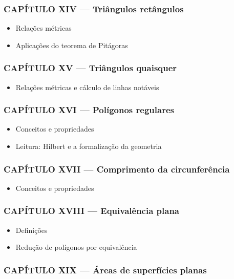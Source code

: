 \documentclass[a4paper,12pt]{article}[abntex2]
\begin{document}
\subsubsection*{CAPÍTULO XIV — Triângulos retângulos}

\begin{itemize}
\item Relações métricas
\item Aplicações do teorema de Pitágoras
\end{itemize}
\subsubsection*{CAPÍTULO XV — Triângulos quaisquer}

\begin{itemize}
\item Relações métricas e cálculo de linhas notáveis
\end{itemize}
\subsubsection*{CAPÍTULO XVI — Polígonos regulares}

\begin{itemize}
\item Conceitos e propriedades
\item Leitura: Hilbert e a formalização da geometria
\end{itemize}
\subsubsection*{CAPÍTULO XVII — Comprimento da circunferência}

\begin{itemize}
\item Conceitos e propriedades
\end{itemize}
\subsubsection*{CAPÍTULO XVIII — Equivalência plana}

\begin{itemize}
\item Definições
\item Redução de polígonos por equivalência
\end{itemize}
\subsubsection*{CAPÍTULO XIX — Áreas de superfícies planas}
\end{document}

